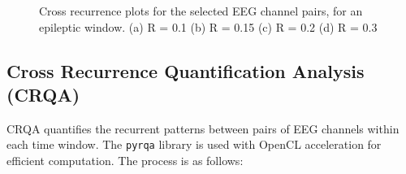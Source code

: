 \documentclass{article}
\begin{document}
\begin{figure}[htbp]
				    \caption{Cross recurrence plots for the selected EEG channel pairs, for an epileptic window. (a) R = 0.1 (b) R = 0.15 (c) R = 0.2 (d) R = 0.3}
				    \label{fig:rp_grid}
				\end{figure}




				\subsection{Cross Recurrence Quantification Analysis (CRQA)}
				\label{subsec:crqa}

				CRQA quantifies the recurrent patterns between pairs of EEG channels within each time window. The \texttt{pyrqa} library is used with OpenCL acceleration for efficient computation. The process is as follows:
\end{document}
